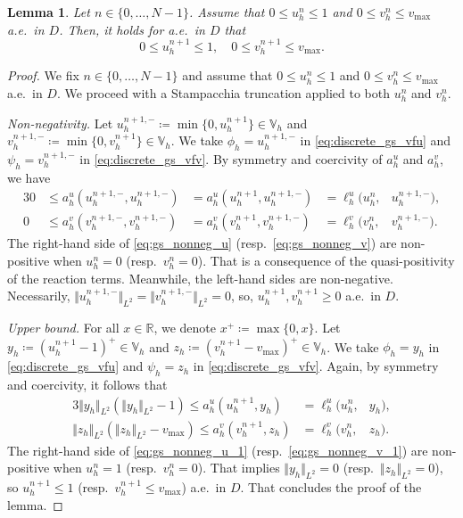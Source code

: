 \documentclass[11pt, a4paper]{amsart}
\newcommand{\RR}{\mathbb{R}}
\newcommand{\VV}{\mathbb{V}}
\newtheorem{lemma}[theorem]{Lemma}%
\numberwithin{equation}{section}
\begin{document}
	
	\begin{lemma}\label{lem:discrete_gs_bounded_solution}
		Let $n\in\{0,\ldots,N-1\}$. Assume that $0\leq u_h^n\leq 1$ and $0\leq v_h^n\leq v_{\mathrm{max}}$ a.e.\ in $D$. Then, it holds for a.e.\ in $D$ that
		\[
		0\leq u_h^{n+1}\leq 1,\quad 0\leq v_h^{n+1}\leq v_{\mathrm{max}}.
		\]
	\end{lemma}
	\begin{proof}
		We fix $n\in\{0,\ldots,N-1\}$ and assume that $0\leq u_h^n\leq 1$ and $0\leq v_h^n\leq v_{\mathrm{max}}$ a.e.\ in $D$. We proceed with a Stampacchia truncation
		applied to both $u_h^n$ and $v_h^n$.
		
		\textit{Non-negativity.} 
		Let $u_h^{n+1,-}\coloneqq\min\{0,u_h^{n+1}\}\in \VV_h$ and $v_h^{n+1,-}\coloneqq\min\{0,v_h^{n+1}\}\in \VV_h$. We take $\phi_h = u_h^{n+1,-}$ in \eqref{eq:discrete_gs_vfu} and $\psi_h = v_h^{n+1,-}$ in \eqref{eq:discrete_gs_vfv}. By symmetry and coercivity of $a_h^u$ and $a_h^v$, we have
		\begin{alignat}{3}
			\label{eq:gs_nonneg_u}
			0&\leq a_h^u(u_h^{n+1,-},u_h^{n+1,-}) &{}=a_h^u(u_h^{n+1},u_h^{n+1,-}) &=\ell_h^u(u_h^{n},&u_h^{n+1,-}),
			\\
			\label{eq:gs_nonneg_v}
			0 &\leq a_h^v(v_h^{n+1,-},v_h^{n+1,-}) &{}= a_h^v(v_h^{n+1},v_h^{n+1,-}) &= \ell_h^v(v_h^{n},&v_h^{n+1,-}).
		\end{alignat}
		The right-hand side of \eqref{eq:gs_nonneg_u} (resp.\ \eqref{eq:gs_nonneg_v}) are non-positive when $u_h^{n} = 0$ (resp.\ $v_h^{n} = 0$). That is a consequence of the quasi-positivity of the reaction terms. Meanwhile, the left-hand sides are non-negative. Necessarily, $\Vert u_h^{n+1,-}\Vert_{L^2} =\Vert v_h^{n+1,-}\Vert_{L^2} = 0$, so, $u_h^{n+1}, v_h^{n+1}\geq 0$ a.e.\ in $D$. 
		
		\textit{Upper bound.} For all $x\in\RR$, we denote $x^+\coloneqq\max\{0,x\}$. Let $y_h\coloneqq (u_h^{n+1}- 1)^+\in \VV_h$ and $z_h\coloneqq (v_h^{n+1}- v_{\mathrm{max}})^+\in \VV_h$. We take $\phi_h = y_h$ in \eqref{eq:discrete_gs_vfu} and $\psi_h = z_h$ in \eqref{eq:discrete_gs_vfv}. Again, by symmetry and coercivity, it follows that
		\begin{alignat}{3}
			\label{eq:gs_nonneg_u_1}
			\Vert y_h\Vert_{L^2}(\Vert y_h\Vert_{L^2} - 1)\leq  a_h^u(u_h^{n+1},y_h) &= \ell_h^u(u_h^{n},&y_h),
			\\
			\label{eq:gs_nonneg_v_1}
			\Vert z_h\Vert_{L^2}(\Vert z_h\Vert_{L^2} - v_{\mathrm{max}})\leq  a_h^v(v_h^{n+1},z_h) &= \ell_h^v(v_h^{n},&z_h).
		\end{alignat}
		The right-hand side of \eqref{eq:gs_nonneg_u_1} (resp.\ \eqref{eq:gs_nonneg_v_1}) are non-positive when $u_h^{n} = 1$ (resp.\ $v_h^{n} = 0$).
		That implies $\Vert y_h\Vert_{L^2} = 0$ (resp.\ $\Vert z_h\Vert_{L^2} = 0$), so $u_h^{n+1}\leq 1$ (resp.\ $v_h^{n+1}\leq v_{\mathrm{max}}$) a.e.\ in $D$. That concludes the proof of the lemma.
	\end{proof}
	
\end{document}
